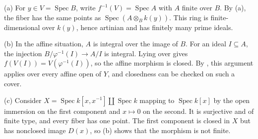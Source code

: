 (a) For $y\in V=\operatorname{Spec}B$, write $f^{-1}(V)=\operatorname{Spec}A$ with $A$ finite over $B$. By (a), the fiber has the same points as $\operatorname{Spec}(A\otimes_Bk(y))$. This ring is finite-dimensional over $k(y)$, hence artinian and has finitely many prime ideals.

(b) In the affine situation, $A$ is integral over the image of $B$. For an ideal $I\subseteq A$, the injection $B/\varphi^{-1}(I)\to A/I$ is integral. Lying over gives $f(V(I))=V(\varphi^{-1}(I))$, so the affine morphism is closed. By , this argument applies over every affine open of $Y$, and closedness can be checked on such a cover.

(c) Consider $X=\operatorname{Spec}k[x,x^{-1}]\coprod\operatorname{Spec}k$ mapping to $\operatorname{Spec}k[x]$ by the open immersion on the first component and $x\mapsto0$ on the second. It is surjective and of finite type, and every fiber has one point. The first component is closed in $X$ but has nonclosed image $D(x)$, so (b) shows that the morphism is not finite.
